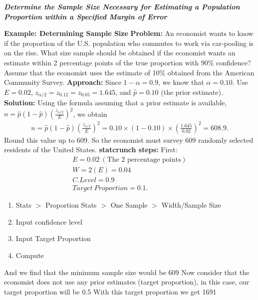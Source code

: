 \documentclass{report}
\begin{document}
     \pagebreak \bigbreak \noindent 
     \textbf{\textit{Determine the Sample Size Necessary for Estimating a Population Proportion within a Specified Margin of Error}}
     \bigbreak \noindent 
     \begin{mdframed}
       \textbf{Example: Determining Sample Size}
       \bigbreak \noindent 
       \textbf{Problem:}
       An economist wants to know if the proportion of the U.S. population who commutes to work via car-pooling is on the rise. What size sample should be obtained if the economist wants an estimate within 2 percentage points of the true proportion with 90\% confidence?
       \bigbreak \noindent 
       Assume that the economist uses the estimate of 10\% obtained from the American Community Survey.
       \bigbreak \noindent 
       \textbf{Approach:}
       Since \(1 - \alpha = 0.9\), we know that \(\alpha = 0.10\). Use \(E = 0.02\), \(z_{\alpha/2} = z_{0.12} = z_{0.05} = 1.645\), and \(\hat{p} = 0.10\) (the prior estimate).
       \bigbreak \noindent 
       \textbf{Solution:}
       Using the formula assuming that a prior estimate is available, \(n = \hat{p}(1 - \hat{p})\left(\frac{z_{\alpha/2}}{E}\right)^2\), we obtain
       \begin{align*}
           n = \hat{p}(1 - \hat{p})\left(\frac{z_{\alpha/2}}{E}\right)^2 = 0.10 \times (1 - 0.10) \times \left(\frac{1.645}{0.02}\right)^2 = 608.9 
       .\end{align*}
       Round this value up to 609. So the economist must survey 609 randomly selected residents of the United States.
       \bigbreak \noindent 
       \textbf{statcrunch steps:}
       \bigbreak \noindent 
       First:
       \begin{align*}
           E = 0.02\ (\text{The 2 percentage points}) \\
           W = 2(E) = 0.04 \\
           C.Level = 0.9 \\
           Target\ Proportion = 0.1
       .\end{align*}
       \begin{enumerate}
           \item Stats $>$ Proportion Stats $>$ One Sample $> $ Width/Sample Size
            \item Input confidence level
            \item Input Target Proportion
            \item Compute
       \end{enumerate}
       \bigbreak \noindent 
       And we find that the minimum sample size would be 609
       \bigbreak \noindent 
       Now consider that the economist does not use any prior estimates (target proportion), in this case, our target proportion will be 0.5
       \bigbreak \noindent 
       With this target proportion we get 1691
     \end{mdframed}
\end{document}
